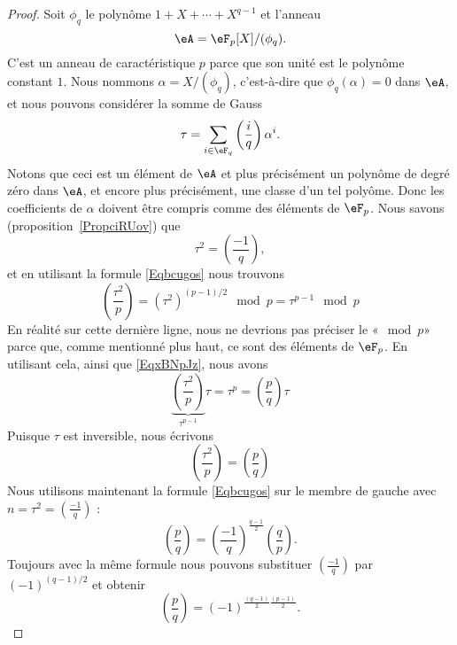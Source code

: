 \begin{proof}
	Soit \( \phi_q\) le polynôme \( 1+X+\cdots+X^{q-1}\) et l'anneau
	\begin{equation}
		\eA=\eF_p[X]/(\phi_q).
	\end{equation}
	C'est un anneau de caractéristique \( p\) parce que son unité est le polynôme constant \( 1\). Nous nommons \( \alpha=X/(\phi_q)\), c'est-à-dire que \( \phi_q(\alpha)=0\) dans \( \eA\), et nous pouvons considérer la somme de Gauss
	\begin{equation}
		\tau=\sum_{i\in \eF_q}\left(\frac{i}{q}\right)\alpha^i.
	\end{equation}
	Notons que ceci est un élément de \( \eA\) et plus précisément un polynôme de degré zéro dans \( \eA\), et encore plus précisément, une classe d'un tel polyôme. Donc les coefficients de \( \alpha\) doivent être compris comme des éléments de \( \eF_p\).
	Nous savons (proposition~\ref{PropciRUov}) que
	\begin{equation}
		\tau^2=\left(\frac{-1}{q}\right),
	\end{equation}
	et en utilisant la formule \eqref{Eqbcugos} nous trouvons
	\begin{equation}
		\left(\frac{\tau^2}{p}\right)=(\tau^2)^{(p-1)/2}\mod p=\tau^{p-1}\mod p
	\end{equation}
	En réalité sur cette dernière ligne, nous ne devrions pas préciser le «\(\mod p\)» parce que, comme mentionné plus haut, ce sont des éléments de \( \eF_p\). En utilisant cela, ainsi que \eqref{EqxBNpJz}, nous avons
	\begin{equation}
		\underbrace{\left(\frac{\tau^2}{p}\right)}_{\tau^{p-1}}\tau=\tau^p=\left(\frac{p}{q}\right)\tau
	\end{equation}
	Puisque \( \tau\) est inversible, nous écrivons
	\begin{equation}
		\left(\frac{\tau^2}{p}\right)=\left(\frac{p}{q}\right)
	\end{equation}
	Nous utilisons maintenant la formule \eqref{Eqbcugos} sur le membre de gauche avec \( n=\tau^2=\left(\frac{-1}{q}\right)\) :
	\begin{equation}
		\left(\frac{p}{q}\right)=\left(\frac{-1}{q}\right)^{\frac{ q-1 }{2}}\left(\frac{q}{p}\right).
	\end{equation}
	Toujours avec la même formule nous pouvons substituer \( \left(\frac{-1}{q}\right)\) par \( (-1)^{(q-1)/2}\) et obtenir
	\begin{equation}
		\left(\frac{p}{q}\right)=(-1)^{\frac{ (q-1) }{2}\frac{ (p-1) }{2}}.
	\end{equation}
\end{proof}

